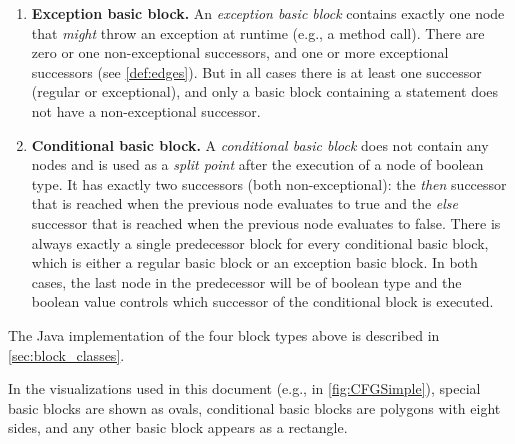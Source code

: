 \begin{definition}
\begin{enumerate}
        \item \textbf{Exception basic block.} An \emph{exception basic
          block} contains exactly one node that \emph{might} throw an
          exception at runtime (e.g., a method call).  There are zero
          or one non-exceptional successors, and one or more
          exceptional successors (see \autoref{def:edges}). But in all
          cases there is at least one successor (regular or
          exceptional), and only a basic block containing a
           statement does not have a non-exceptional
          successor.

        \item \textbf{Conditional basic block.} A \emph{conditional
          basic block} does not contain any nodes and is used as a
          \emph{split point} after the execution of a node of boolean
          type. It has exactly two successors (both non-exceptional):
          the \emph{then} successor that is reached when the previous node
          evaluates to true and the \emph{else} successor that is reached
          when the previous node evaluates to false.  There is always
          exactly a single predecessor block for every conditional
          basic block, which is either a regular basic block or an
          exception basic block. In both cases, the last node in the
          predecessor will be of boolean type and the boolean value
          controls which successor of the conditional block is
          executed.
    \end{enumerate}
\end{definition}

The Java implementation of the four block types above is described in
\autoref{sec:block_classes}.

In the visualizations used in this document (e.g., in
\autoref{fig:CFGSimple}), special basic blocks are shown as ovals,
conditional basic blocks are polygons with eight sides, and any other
basic block appears as a rectangle.

